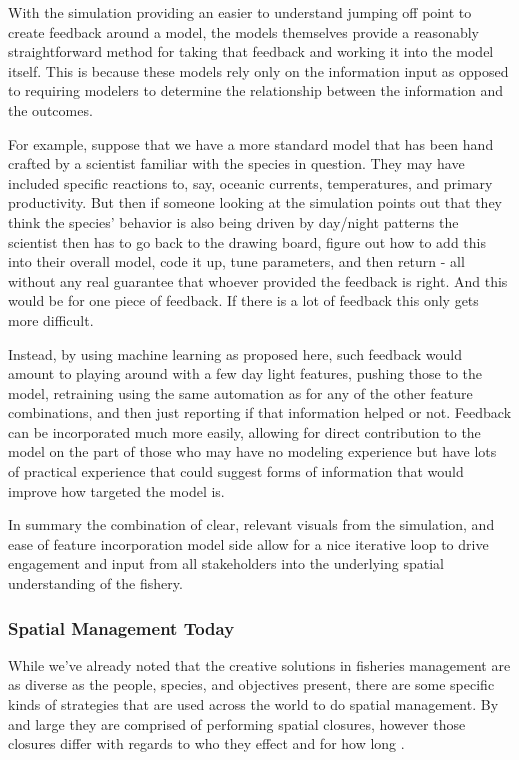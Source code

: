 \documentclass[11pt]{article}
\begin{document}
With the simulation providing an easier to understand jumping off point to create feedback around a model, the models themselves provide a reasonably straightforward method for taking that feedback and working it into the model itself. This is because these models rely only on the information input as opposed to requiring modelers to determine the relationship between the information and the outcomes. 

For example, suppose that we have a more standard model that has been hand crafted by a scientist familiar with the species in question. They may have included specific reactions to, say, oceanic currents, temperatures, and primary productivity. But then if someone looking at the simulation points out that they think the species' behavior is also being driven by day/night patterns the scientist then has to go back to the drawing board, figure out how to add this into their overall model, code it up, tune parameters, and then return - all without any real guarantee that whoever provided the feedback is right. And this would be for one piece of feedback. If there is a lot of feedback this only gets more difficult. 

Instead, by using machine learning as proposed here, such feedback would amount to playing around with a few day light features, pushing those to the model, retraining using the same automation as for any of the other feature combinations, and then just reporting if that information helped or not. Feedback can be incorporated much more easily, allowing for direct contribution to the model on the part of those who may have no modeling experience but have lots of practical experience that could suggest forms of information that would improve how targeted the model is.
\newline

In summary the combination of clear, relevant visuals from the simulation, and ease of feature incorporation model side allow for a nice iterative loop to drive engagement and input from all stakeholders into the underlying spatial understanding of the fishery.  

\subsubsection{Spatial Management Today} 

While we've already noted that the creative solutions in fisheries management are as diverse as the people, species, and objectives present, there are some specific kinds of strategies that are used across the world to do spatial management. By and large they are comprised of performing spatial closures, however those closures differ with regards to who they effect and for how long \cite{selig2016} \cite{little2014}. \newline
\end{document}
